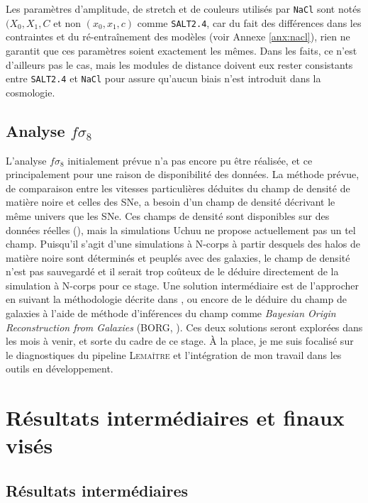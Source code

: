 \documentclass{book}
\def\lemaitre{\textsc{Lemaître}\xspace}
\def\nacl{\texttt{NaCl}\xspace}
\def\saltd{\texttt{SALT2.4}\xspace}
\begin{document}
Les paramètres d'amplitude, de stretch et de couleurs utilisés par \nacl sont notés $(X_0, X_1, C$ et non $(x_0, x_1, c)$ comme \saltd, car du fait des différences dans les contraintes et du ré-entraînement des modèles (voir Annexe \ref{anx:nacl}), rien ne garantit que ces paramètres soient exactement les mêmes. Dans les faits, ce n'est d'ailleurs pas le cas, mais les modules de distance doivent eux rester consistants entre \saltd et \nacl pour assure qu'aucun biais n'est introduit dans la cosmologie.


\subsection{Analyse $f\sigma_8$}
\label{sec:res_fs8}
L'analyse $f\sigma_8$ initialement prévue n'a pas encore pu être réalisée, et ce principalement pour une raison de disponibilité des données. La méthode prévue, de comparaison entre les vitesses particulières déduites du champ de densité de matière noire et celles des SNe, a besoin d'un champ de densité décrivant le même univers que les SNe. Ces champs de densité sont disponibles sur des données réelles (\cite{carrick_cosmological_2015}), mais la simulations Uchuu ne propose actuellement pas un tel champ. Puisqu'il s'agit d'une simulations à N-corps à partir desquels des halos de matière noire sont déterminés et peuplés avec des galaxies, le champ de densité n'est pas sauvegardé et il serait trop coûteux de le déduire directement de la simulation à N-corps pour ce stage. Une solution intermédiaire est de l'approcher en suivant la méthodologie décrite dans \cite{carrick_cosmological_2015}, ou encore de le déduire du champ de galaxies à l'aide de méthode d'inférences du champ comme \textit{Bayesian Origin Reconstruction from Galaxies} (BORG, \cite{jasche_physical_2019}). Ces deux solutions seront explorées dans les mois à venir, et sorte du cadre de ce stage. À la place, je me suis focalisé sur le diagnostiques du pipeline \lemaitre et l'intégration de mon travail dans les outils en développement.


\section{Résultats intermédiaires et finaux visés}

\subsection{Résultats intermédiaires}
\end{document}
